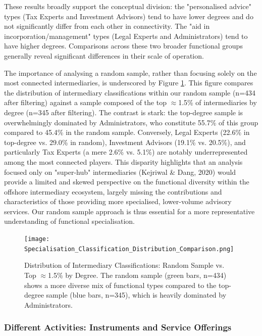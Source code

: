 These results broadly support the conceptual division: the "personalised advice" types (Tax Experts and Investment Advisors) tend to have lower degrees and do not significantly differ from each other in connectivity. The "aid in incorporation/management" types (Legal Experts and Administrators) tend to have higher degrees. Comparisons across these two broader functional groups generally reveal significant differences in their scale of operation.

The importance of analysing a random sample, rather than focusing solely on the most connected intermediaries, is underscored by Figure \ref{fig:specialisation_classification_distribution}. This figure compares the distribution of intermediary classifications within our random sample (n=434 after filtering) against a sample composed of the top $\approx$1.5\% of intermediaries by degree (n=345 after filtering). The contrast is stark: the top-degree sample is overwhelmingly dominated by Administrators, who constitute 55.7\% of this group compared to 45.4\% in the random sample. Conversely, Legal Experts (22.6\% in top-degree vs. 29.0\% in random), Investment Advisors (19.1\% vs. 20.5\%), and particularly Tax Experts (a mere 2.6\% vs. 5.1\%) are notably underrepresented among the most connected players. This disparity highlights that an analysis focused only on "super-hub" intermediaries (Kejriwal \& Dang, 2020) would provide a limited and skewed perspective on the functional diversity within the offshore intermediary ecosystem, largely missing the contributions and characteristics of those providing more specialised, lower-volume advisory services. Our random sample approach is thus essential for a more representative understanding of functional specialisation.

\begin{figure}[htbp]
    \centering
    \texttt{[image: Specialisation\_Classification\_Distribution\_Comparison.png]}
    \caption{Distribution of Intermediary Classifications: Random Sample vs. Top $\approx$1.5\% by Degree. The random sample (green bars, n=434) shows a more diverse mix of functional types compared to the top-degree sample (blue bars, n=345), which is heavily dominated by Administrators.}
    \label{fig:specialisation_classification_distribution}
\end{figure}

\subsubsection{Different Activities: Instruments and Service Offerings}
\label{subsubsec:activities_functional}

